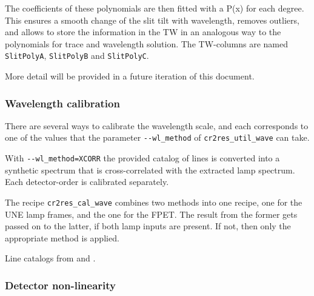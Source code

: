 The coefficients of these polynomials are then fitted with a P(x) for each
degree. This ensures a smooth change of the slit tilt with wavelength, removes
outliers, and allows to store the information in the TW in an analogous way to
the polynomials for trace and wavelength solution. The TW-columns are named \verb!SlitPolyA!, \verb!SlitPolyB! and \verb!SlitPolyC!.

More detail will be provided in a future iteration of this document.

\subsubsection{Wavelength calibration}

There are several ways to calibrate the wavelength scale, and each corresponds
to one of the values that the parameter \texttt{-{}-wl\_method} of
\texttt{cr2res\_util\_wave} can take.

With \texttt{-{}-wl\_method=XCORR} the provided catalog of lines is converted
into a synthetic spectrum that is cross-correlated with the extracted lamp
spectrum. Each detector-order is calibrated separately.

The recipe \texttt{cr2res\_cal\_wave} combines two methods into one recipe, one
for the UNE lamp frames, and the one for the FPET. The result from the former
gets passed on to the latter, if both lamp inputs are present. If not, then only
the appropriate method is applied.

Line catalogs from \cite{2018A&A...618A.118S} and \cite{2011ApJS..195...24R}.

\subsubsection{Detector non-linearity}
\label{sec:detlin}



